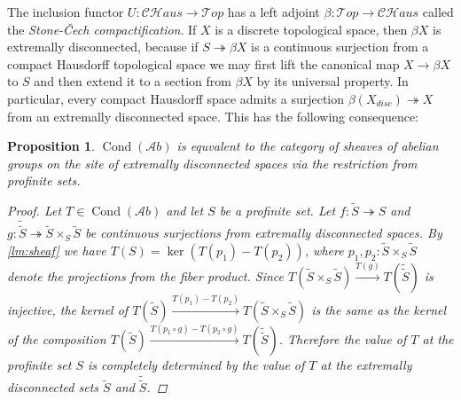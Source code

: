 \documentclass[11pt,A4]{article}
\theoremstyle{plain}
\newtheorem{prop}[thm]{Proposition}
\theoremstyle{definition}
\theoremstyle{remark}
\newcommand{\1}{\mathbbm{1}}
\newcommand{\Top}{\mathscr{T}op}
\newcommand{\CHaus}{\mathscr{CH}aus}
\newcommand{\Ab}{\mathscr{A}b}
\DeclareMathOperator{\Cond}{Cond}
\newcommand{\fp}[1]{\times_{#1}}
\begin{document}
The inclusion functor $U\colon \CHaus\to \Top$ has a left adjoint $\beta\colon \Top\to \CHaus$ called the \textit{Stone-\v{C}ech compactification}.
If $X$ is a discrete topological space, then $\beta X$ is extremally disconnected, because if $S\twoheadrightarrow \beta X$ is a continuous surjection from a compact Hausdorff topological space we may first lift the canonical map $X\to \beta X$ to $S$ and then extend it to a section from $\beta X$ by its universal property.
In particular, every compact Hausdorff space admits a surjection $\beta(X_{disc})\twoheadrightarrow X$ from an extremally disconnected space.
This has the following consequence:

\begin{prop}
    $\Cond(\Ab)$ is equvalent to the category of sheaves of abelian groups on the site of extremally disconnected spaces via the restriction from profinite sets.
    \begin{proof}
	Let $T\in \Cond(\Ab)$ and let $S$ be a profinite set.
	Let $f\colon \tilde{S}\twoheadrightarrow S$ and $g\colon \tilde{\tilde{S}}\twoheadrightarrow \tilde{S}\fp{S}\tilde{S}$ be continuous surjections from extremally disconnected spaces.
	By \cref{lm:sheaf} we have $T(S)=\ker(T(p_{1})-T(p_{2}))$, where $p_{1},p_{2}\colon \tilde{S}\fp{S}\tilde{S}$ denote the projections from the fiber product.
	Since $T(\tilde{S}\fp{S}\tilde{S})\xrightarrow{T(g)} T(\tilde{\tilde{S}})$ is injective, the kernel of $T(\tilde{S})\xrightarrow{T(p_{1})-T(p_{2})} T(\tilde{S}\fp{S}\tilde{S})$ is the same as the kernel of the composition $T(\tilde{S})\xrightarrow{T(p_{1}\circ g)-T(p_{2}\circ g)} T(\tilde{\tilde{S}})$.
	Therefore the value of $T$ at the profinite set $S$ is completely determined by the value of $T$ at the extremally disconnected sets $\tilde{S}$ and $\tilde{\tilde{S}}$.
    \end{proof}
\end{prop}
\end{document}
